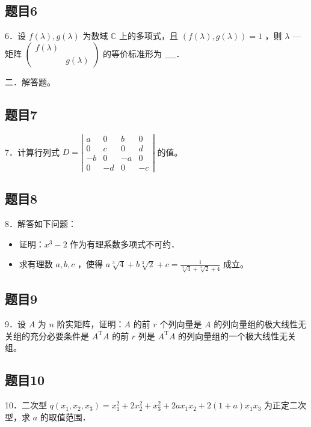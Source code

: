 \documentclass{article}
\begin{document}
\subsection{题目6}
6．设 \(f(\lambda), g(\lambda)\) 为数域 \(\mathbb{C}\) 上的多项式，且 \((f(\lambda), g(\lambda))=1\) ，则 \(\lambda\) —矩阵 \(\left(\begin{array}{ll}f(\lambda) & \\ & g(\lambda)\end{array}\right)\) 的等价标准形为 \(\_\_\_\_\)．

二．解答题。\\

\subsection{题目7}
7．计算行列式 \(D=\left|\begin{array}{cccc}a & 0 & b & 0 \\ 0 & c & 0 & d \\ -b & 0 & -a & 0 \\ 0 & -d & 0 & -c\end{array}\right|\) 的值。

\subsection{题目8}
8．解答如下问题：

\begin{itemize}
  \item[（1）] 证明：\(x^{3}-2\) 作为有理系数多项式不可约．
  \item[（2）] 求有理数 \(a, b, c\) ，使得 \(a \sqrt[3]{4}+b \sqrt[3]{2}+c=\frac{1}{\sqrt[3]{4}+\sqrt[3]{2}+4}\) 成立。
\end{itemize}

\subsection{题目9}
9．设 \(A\) 为 \(n\) 阶实矩阵，证明：\(A\) 的前 \(r\) 个列向量是 \(A\) 的列向量组的极大线性无关组的充分必要条件是 \(A^{\mathrm{T}} A\) 的前 \(r\) 列是 \(A^{\mathrm{T}} A\) 的列向量组的一个极大线性无关组。

\subsection{题目10}
10．二次型 \(q\left(x_{1}, x_{2}, x_{3}\right)=x_{1}^{2}+2 x_{2}^{2}+x_{3}^{2}+2 a x_{1} x_{2}+2(1+a) x_{1} x_{3}\) 为正定二次型，求 \(a\) 的取值范围．
\end{document}
